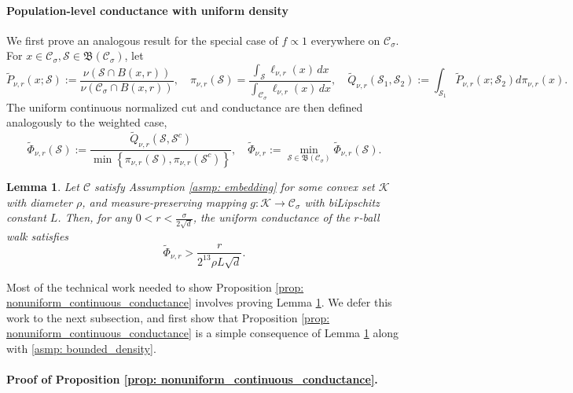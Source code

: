 \documentclass{article}
\newcommand{\set}[1]{\left\{#1\right\}}
\newcommand{\1}{\mathbf{1}}
\newcommand{\Sset}{\mathcal{S}}
\newcommand{\Cset}{\mathcal{C}}
\newcommand{\Csig}{\Cset_{\sigma}}
\newcommand{\dx}{\,dx}
\theoremstyle{aldenthm}
\newtheorem{lemma}{Lemma}
\theoremstyle{aldenrmrk}
\begin{document}
\paragraph{Population-level conductance with uniform density}
We first prove an analogous result for the special case of $f \propto 1$ everywhere on $\Csig$. For $x \in \Csig, \Sset \in \mathfrak{B}(\Csig)$, let 
\begin{equation*}
\widetilde{P}_{\nu,r}(x; \Sset) := \frac{\nu(\Sset \cap B(x,r))}{\nu(\Csig \cap B(x,r))}, \quad \pi_{\nu,r}(\Sset) = \frac{\int_{\Sset} \ell_{\nu,r}(x) \dx}{\int_{\Csig} \ell_{\nu,r}(x) \dx}, \quad  \widetilde{Q}_{\nu,r}(\Sset_1,\Sset_2) := \int_{\Sset_1} \widetilde{P}_{\nu,r}(x;\Sset_2) d\pi_{\nu,r}(x).
\end{equation*}
The uniform continuous normalized cut and conductance are then defined analogously to the weighted case,
\begin{equation*}
\widetilde{\Phi}_{\nu,r}(\Sset) := \frac{\widetilde{Q}_{\nu,r}(\Sset, \Sset^c)}{\min \set{\pi_{\nu,r}(\Sset),\pi_{\nu,r}(\Sset^c)}}, \quad \widetilde{\Phi}_{\nu,r} := \min_{\Sset \in \mathfrak{B}(\Csig)} \widetilde{\Phi}_{\nu,r}(\Sset).
\end{equation*}

\begin{lemma}
	\label{lem: uniform_continuous_conductance}
	Let $\Cset$ satisfy Assumption \ref{asmp: embedding} for some convex set $\mathcal{K}$ with diameter $\rho$, and measure-preserving mapping $g: \mathcal{K} \to \Csig$ with biLipschitz constant $L$. Then, for any $0 < r < \frac{\sigma}{2\sqrt{d}}$, the uniform conductance of the $r$-ball walk satisfies
	\begin{equation*}
	\widetilde{\Phi}_{\nu,r} > \frac{r}{2^{13} \rho L \sqrt{d}}.
	\end{equation*}
\end{lemma}

Most of the technical work needed to show Proposition \ref{prop: nonuniform_continuous_conductance} involves proving Lemma \ref{lem: uniform_continuous_conductance}. We defer this work to the next subsection, and first show that Proposition \ref{prop: nonuniform_continuous_conductance} is a simple consequence of Lemma \ref{lem: uniform_continuous_conductance} along with \ref{asmp: bounded_density}.

\paragraph{Proof of Proposition \ref{prop: nonuniform_continuous_conductance}.}
\end{document}
